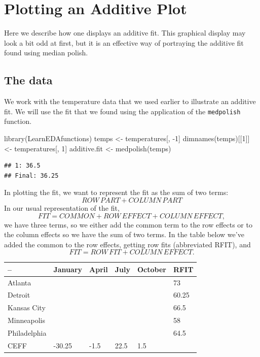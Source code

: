 \documentclass[
]{book}
\newenvironment{Shaded}{\begin{snugshade}}{\end{snugshade}}
\newcommand{\DecValTok}[1]{\textcolor[rgb]{0.00,0.00,0.81}{#1}}
\newcommand{\FunctionTok}[1]{\textcolor[rgb]{0.00,0.00,0.00}{#1}}
\newcommand{\NormalTok}[1]{#1}
\newcommand{\OtherTok}[1]{\textcolor[rgb]{0.56,0.35,0.01}{#1}}
\newcommand{\SpecialCharTok}[1]{\textcolor[rgb]{0.00,0.00,0.00}{#1}}
\begin{document}
\hypertarget{plotting-an-additive-plot}{%
\chapter{Plotting an Additive Plot}\label{plotting-an-additive-plot}}

Here we describe how one displays an additive fit. This graphical display may look a bit odd at first, but it is an effective way of portraying the additive fit found using median polish.

\hypertarget{the-data-1}{%
\section{The data}\label{the-data-1}}

We work with the temperature data that we used earlier to illustrate an additive fit. We will use the fit that we found using the application of the \texttt{medpolish} function.

\begin{Shaded}
\begin{Highlighting}[]
\FunctionTok{library}\NormalTok{(LearnEDAfunctions)}
\NormalTok{temps }\OtherTok{\textless{}{-}}\NormalTok{ temperatures[, }\SpecialCharTok{{-}}\DecValTok{1}\NormalTok{]}
\FunctionTok{dimnames}\NormalTok{(temps)[[}\DecValTok{1}\NormalTok{]] }\OtherTok{\textless{}{-}}\NormalTok{ temperatures[, }\DecValTok{1}\NormalTok{]}
\NormalTok{additive.fit }\OtherTok{\textless{}{-}} \FunctionTok{medpolish}\NormalTok{(temps)}
\end{Highlighting}
\end{Shaded}

\begin{verbatim}
## 1: 36.5
## Final: 36.25
\end{verbatim}

In plotting the fit, we want to represent the fit as the sum of two terms:
\[
ROW \, PART + COLUMN \, PART
\]
In our usual representation of the fit,
\[
FIT = COMMON + ROW \, EFFECT + COLUMN \, EFFECT,
\]
we have three terms, so we either add the common term to the row effects or to the column effects so we have the sum of two terms. In the table below we've added the common to the row effects, getting row fits (abbreviated RFIT), and
\[
FIT = ROW \, FIT + COLUMN \, EFFECT .
\]

\begin{longtable}[]{@{}llllll@{}}
\toprule
-- & January & April & July & October & RFIT \\
\midrule
\endhead
Atlanta & & & & & 73 \\
Detroit & & & & & 60.25 \\
Kansas City & & & & & 66.5 \\
Minneapolis & & & & & 58 \\
Philadelphia & & & & & 64.5 \\
CEFF & -30.25 & -1.5 & 22.5 & 1.5 & \\
\bottomrule
\end{longtable}
\end{document}
